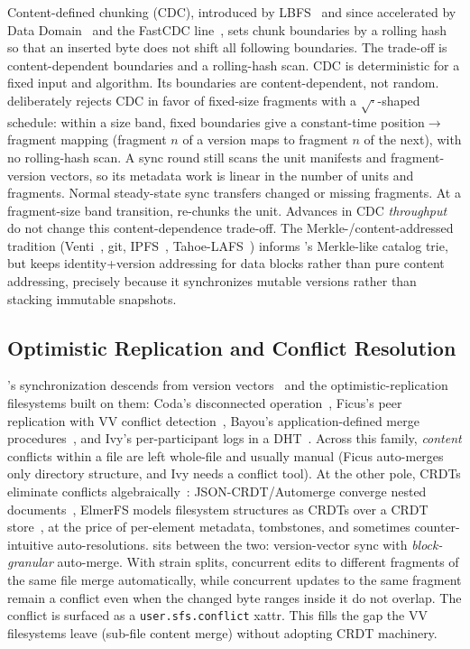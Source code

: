 Content-defined chunking (CDC), introduced by LBFS~\citep{Muthitacharoen2001LBFS}
and since accelerated by Data Domain~\citep{Zhu2008DataDomain} and the FastCDC
line~\citep{Xia2016FastCDC}, sets chunk boundaries by a rolling hash so that an
inserted byte does not shift all following boundaries. The trade-off is
content-dependent boundaries and a rolling-hash scan. CDC is deterministic for
a fixed input and algorithm. Its boundaries are content-dependent, not random.
\sfs{} deliberately rejects CDC in favor of fixed-size fragments with a
$\sqrt{\cdot}$-shaped schedule: within a size band, fixed boundaries give a
constant-time position$\rightarrow$fragment mapping (fragment $n$ of a version
maps to fragment $n$ of the next), with no rolling-hash scan. A sync round still
scans the unit manifests and fragment-version vectors, so its metadata work is
linear in the number of units and fragments. Normal steady-state sync transfers
changed or missing fragments. At a fragment-size band transition, \sfs{}
re-chunks the unit.
Advances in CDC \emph{throughput} do not change this content-dependence trade-off.
The Merkle-/content-addressed tradition (Venti~\citep{Quinlan2002Venti},
git, IPFS~\citep{Benet2014IPFS}, Tahoe-LAFS~\citep{WilcoxOHearn2008Tahoe}) informs
\sfs{}'s Merkle-like catalog trie, but \sfs{} keeps identity+version addressing
for data blocks rather than pure content addressing, precisely because it
synchronizes mutable versions rather than stacking immutable snapshots.

\subsection{Optimistic Replication and Conflict Resolution}
\label{subsec:rw-replication}

\sfs{}'s synchronization descends from version vectors~\citep{Parker1983VersionVectors}
and the optimistic-replication filesystems built on them: Coda's disconnected
operation~\citep{Kistler1992Coda}, Ficus's peer replication with VV conflict
detection~\citep{Reiher1994Ficus}, Bayou's application-defined merge
procedures~\citep{Terry1995Bayou}, and Ivy's per-participant logs in a
DHT~\citep{Muthitacharoen2002Ivy}. Across this family, \emph{content} conflicts
within a file are left whole-file and usually manual (Ficus auto-merges only
directory structure, and Ivy needs a conflict tool). At the other pole, CRDTs
eliminate conflicts algebraically~\citep{Shapiro2011CRDT}: JSON-CRDT/Automerge
converge nested documents~\citep{Kleppmann2017JSONCRDT}, ElmerFS models
filesystem structures as CRDTs over a CRDT
store~\citep{Elmerfs2021}, at the price of per-element metadata,
tombstones, and sometimes counter-intuitive auto-resolutions. \sfs{} sits
between the two: version-vector sync with \emph{block-granular} auto-merge.
With strain splits, concurrent edits to different fragments of the same file
merge automatically, while concurrent updates to the same fragment remain a
conflict even when the changed byte ranges inside it do not overlap.  The
conflict is surfaced as a \texttt{user.sfs.conflict} xattr. This fills the gap
the VV filesystems leave (sub-file content merge) without adopting CRDT
machinery.

